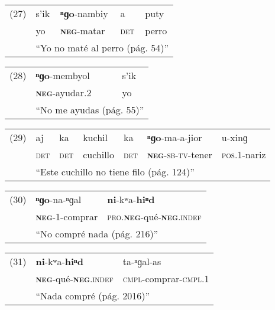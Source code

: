 {\setmainfont{Charis SIL}

\begin{tabular}{lllll}
 (27) & s'ik & \textbf{ⁿɡo}-nambiy & a & puty\\
& yo & \textsc{\textbf{neg}}-matar & \textsc{det} & perro \\
& \multicolumn{4}{l}{``Yo no maté al perro (pág. 54)''}
\end{tabular}\vspace{0.5cm}

\begin{tabular}{lll}
(28) & \textbf{ⁿɡo}-membyol & s'ik \\
& \textsc{\textbf{neg}}-ayudar.2 & yo \\
& \multicolumn{2}{l}{``No me ayudas (pág. 55)''} \\
\end{tabular} \vspace{0.5cm}

\begin{tabular}{lllllll}
(29) & aj & ka & kuchil & ka & \textbf{ⁿɡo}-ma-a-jior & u-xinɡ \\
& \textsc{det} & \textsc{det} & cuchillo & \textsc{det} & \textsc{\textbf{neg}-sb-tv}-tener & \textsc{pos.1}-nariz \\
& \multicolumn{6}{l}{``Este cuchillo no tiene filo (pág. 124)''} \\
\end{tabular} \vspace{0.5cm}

\begin{tabular}{lll}
(30) & \textbf{ⁿɡo}-na-ⁿɡal & \textbf{ni}-kʷa-\textbf{hiⁿd} \\
& \textsc{\textbf{neg}}-1-comprar & \textsc{pro.\textbf{neg}}-qué-\textsc{\textbf{neg}.indef} \\
& \multicolumn{2}{l}{``No compré nada (pág. 216)''} \\
\end{tabular} \vspace{0.5cm}

\begin{tabular}{lll}
(31) & \textbf{ni}-kʷa-\textbf{hiⁿd} & ta-ⁿɡal-as \\
& \textsc{\textbf{neg}}-qué-\textsc{\textbf{neg}.indef} & \textsc{cmpl}-comprar-\textsc{cmpl.1} \\
& \multicolumn{2}{l}{``Nada compré (pág. 2016)''} \\
\end{tabular} \vspace{0.3cm}

}

